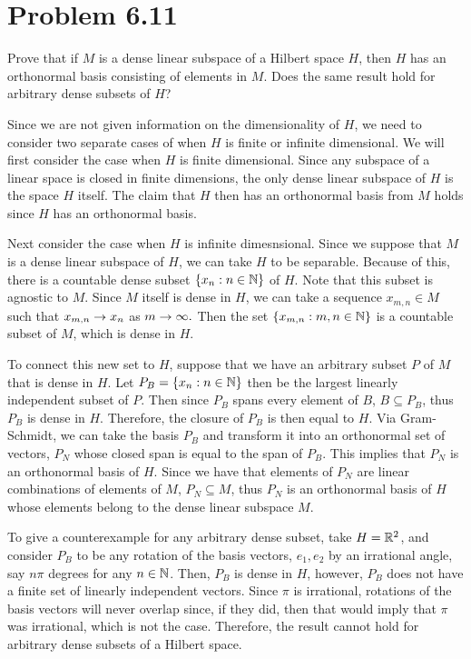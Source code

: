 \section{Problem 6.11}
Prove that if $M$ is a dense linear subspace of a Hilbert space $H$, then $H$ has an orthonormal basis consisting of elements in $M$. Does the same result hold for arbitrary dense subsets of $H$?
\partbreak
\begin{solution}

    Since we are not given information on the dimensionality of $H$, we need to consider two separate cases of when $H$ is finite or infinite dimensional. We will first consider the case when $H$ is finite dimensional. Since any subspace of a linear space is closed in finite dimensions, the only dense linear subspace of $H$ is the space $H$ itself. The claim that $H$ then has an orthonormal basis from $M$ holds since $H$ has an orthonormal basis. \par
    
    \hop 
    Next consider the case when $H$ is infinite dimesnsional. Since we suppose that $M$ is a dense linear subspace of $H$, we can take $H$ to be separable. Because of this, there is a countable dense subset $\{x_n : n \in \mathbb{N}\}$ of $H$. Note that this subset is agnostic to $M$. Since $M$ itself is dense in $H$, we can take a sequence $x_{m, n} \in M$ such that $x_{m, n} \rightarrow x_n$ as $m \rightarrow \infty.$ Then the set $\{ x_{m, n} : m, n \in \mathbb{N}\}$ is a countable subset of $M$, which is dense in $H$. \par

    \hop
    To connect this new set to $H$, suppose that we have an arbitrary subset $P$ of $M$ that is dense in $H$. Let $P_B = \{x_n : n \in \mathbb{N}\}$ then be the largest linearly independent subset of $P$. Then since $P_B$ spans every element of $B$, $B \subseteq P_B$, thus $P_B$ is dense in $H$. Therefore, the closure of $P_B$ is then equal to $H$. Via Gram-Schmidt, we can take the basis $P_B$ and transform it into an orthonormal set of vectors, $P_N$ whose closed span is equal to the span of $P_B$. This implies that $P_N$ is an orthonormal basis of $H$. Since we have that elements of $P_N$ are linear combinations of elements of $M$, $P_N \subseteq M$, thus $P_N$ is an orthonormal basis of $H$ whose elements belong to the dense linear subspace $M$. \par

    \hop
    To give a counterexample for any arbitrary dense subset, take $H = \mathbb{R}^2$, and consider $P_B$ to be any rotation of the basis vectors, $e_1, e_2$ by an irrational angle, say $n\pi$ degrees for any $n \in \mathbb{N}$. Then, $P_B$ is dense in $H$, however, $P_B$ does not have a finite set of linearly independent vectors. Since $\pi$ is irrational, rotations of the basis vectors will never overlap since, if they did, then that would imply that $\pi$ was irrational, which is not the case. Therefore, the result cannot hold for arbitrary dense subsets of a Hilbert space.  
\end{solution}

